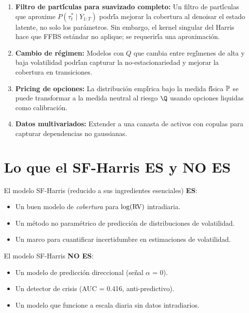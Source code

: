 \begin{enumerate}
    \item \textbf{Filtro de part\'{\'i}culas para suavizado completo:}
    Un filtro de part\'{\'i}culas que aproxime $P(\tau_t^* \mid Y_{1:T})$
    podr\'{\'i}a mejorar la cobertura al denoisar el estado latente, no solo
    los par\'{a}metros. Sin embargo, el kernel singular del Harris hace que
    FFBS est\'{a}ndar no aplique; se requerir\'{\'i}a una aproximaci\'{o}n.

    \item \textbf{Cambio de r\'{e}gimen:} Modelos con $Q$ que cambia entre
    reg\'{\'i}menes de alta y baja volatilidad podr\'{\'i}an capturar la
    no-estacionariedad y mejorar la cobertura en transiciones.

    \item \textbf{Pricing de opciones:} La distribuci\'{o}n emp\'{\'i}rica bajo
    la medida f\'{\'i}sica $\mathbb{P}$ se puede transformar a la medida neutral al
    riesgo $\Q$ usando opciones liquidas como calibraci\'{o}n.

    \item \textbf{Datos multivariados:} Extender a una canasta de activos con
    copulas para capturar dependencias no gaussianas.
\end{enumerate}

\section{Lo que el SF-Harris ES y NO ES}

El modelo SF-Harris (reducido a sus ingredientes esenciales) \textbf{ES}:
\begin{itemize}
    \item Un buen modelo de \emph{cobertura} para $\log(\operatorname{RV})$ intradiaria.
    \item Un m\'{e}todo no param\'{e}trico de predicci\'{o}n de distribuciones
          de volatilidad.
    \item Un marco para cuantificar incertidumbre en estimaciones de volatilidad.
\end{itemize}

El modelo SF-Harris \textbf{NO ES}:
\begin{itemize}
    \item Un modelo de predicci\'{o}n direccional (se\~{n}al $\alpha$ = 0).
    \item Un detector de crisis (AUC = 0.416, anti-predictivo).
    \item Un modelo que funcione a escala diaria sin datos intradiarios.
\end{itemize}